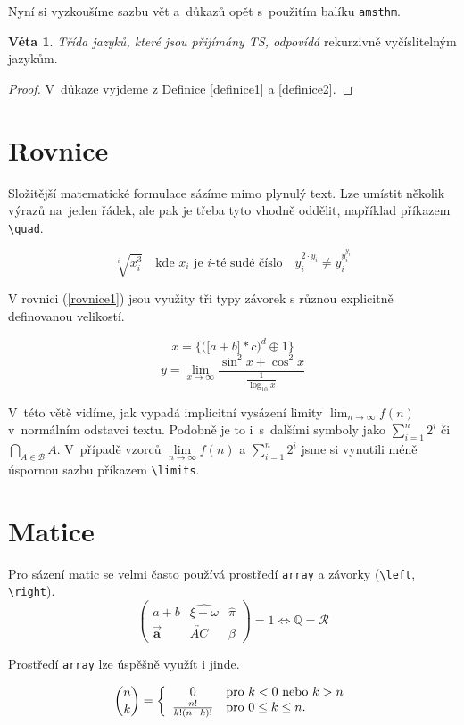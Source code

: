 \documentclass[czech,a4paper,11pt,twocolumn]{article}
\theoremstyle{definition}
\theoremstyle{definition}
\newtheorem{veta}{Věta}
\theoremstyle{definition}
\begin{document}
Nyní si vyzkoušíme sazbu vět a~důkazů opět s~použitím balíku \texttt{amsthm}.

\begin{veta}
\label{Věta 1.} \emph{Třída jazyků, které jsou přijímány TS, odpovídá} rekurzivně vyčíslitelným jazykům.
\end{veta}

\begin{proof}
V~důkaze vyjdeme z Definice \ref{definice1} a \ref{definice2}.
\end{proof}

\section{Rovnice}
Složitější matematické formulace sázíme mimo plynulý text. Lze umístit několik výrazů na~jeden řádek, ale pak je třeba tyto vhodně oddělit, například příkazem \verb|\quad|.


$$\sqrt[i]{x^3_i} \quad \text{kde } x_i \text{ je } i\text{-té sudé číslo}\quad y^{2 \cdot y_i}_i \neq y^{y^{y_i}_i}_i$$


V rovnici (\ref{rovnice1}) jsou využity tři typy závorek s různou explicitně definovanou velikostí.

\begin{equation}
x = \bigg\{\Big(\big[a + b \big] * c \Big)^d \oplus 1 \bigg\}\label{rovnice1}
\end{equation}
\begin{equation}
y = \lim_{x\to\infty} \frac{\sin^2 x + \cos^2 x}{\frac{1}{\log_{10}x}}\label{rovnice2}
\end{equation}

V~této větě vidíme, jak vypadá implicitní vysázení limity $\lim_{n\to\infty}f(n)$ v~normálním odstavci textu. Podobně je to i~s~dalšími symboly jako $\sum_{i=1}^{n} 2^i$ či $\bigcap_{A \in \mathcal{B}} A$. V~případě vzorců $\lim\limits_{n\to\infty}f(n)$ a $\sum\limits_{i=1}^{n} 2^i$ jsme si vynutili méně úspornou sazbu příkazem \verb|\limits|.

\vfill
\section{Matice}
Pro sázení matic se velmi často používá prostředí \texttt{array} a závorky (\verb|\left|, \verb|\right|).
$$
\left( \begin{array}{ccc}
a + b & \widehat{\xi + \omega} & \hat{\pi}\\
\vec{\mathbf{a}} & \overleftrightarrow{AC} & \beta
\end{array}\right)
= 1 \iff \mathbb{Q} = \mathcal{R}
$$

Prostředí \texttt{array} lze úspěšně využít i jinde.

$$
\binom{n}{k} =
\left\{\begin{array}{c l}
0 & \text{pro } k < 0 \text{ nebo } k > n \\
\frac{n!}{k!(n-k)!} & \text{pro } 0 \leq k \leq n.
\end{array} \right. $$
\end{document}
